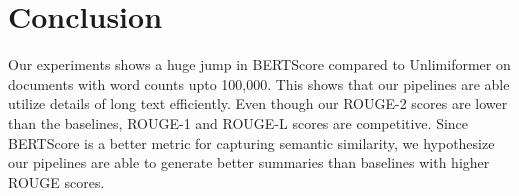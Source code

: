 \section{Conclusion}
\label{sec:conclusion}

Our experiments shows a huge jump in BERTScore compared to Unlimiformer on
documents with word counts upto 100,000.
This shows that our pipelines are able utilize details of long text efficiently.
Even though our ROUGE-2 scores are lower than the baselines, ROUGE-1 and ROUGE-L
scores are competitive.
Since BERTScore is a better metric for capturing semantic similarity, we hypothesize
our pipelines are able to generate better summaries than baselines with higher
ROUGE scores. 
